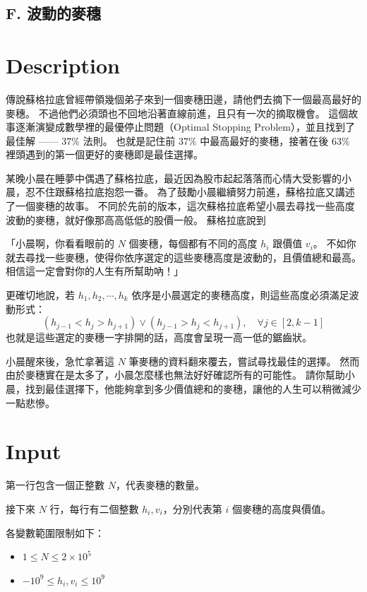 \documentclass[11pt,a4paper]{article}
\begin{document}
\begin{center}
\section*{F. 波動的麥穗}
\end{center}

\section*{Description}

傳說蘇格拉底曾經帶領幾個弟子來到一個麥穗田邊，請他們去摘下一個最高最好的麥穗。
不過他們必須頭也不回地沿著直線前進，且只有一次的摘取機會。
這個故事逐漸演變成數學裡的最優停止問題（Optimal Stopping Problem），並且找到了最佳解 —— $37\%$ 法則。
也就是記住前 $37\%$ 中最高最好的麥穗，接著在後 $63\%$ 裡頭遇到的第一個更好的麥穗即是最佳選擇。

某晚小晨在睡夢中偶遇了蘇格拉底，最近因為股市起起落落而心情大受影響的小晨，忍不住跟蘇格拉底抱怨一番。
為了鼓勵小晨繼續努力前進，蘇格拉底又講述了一個麥穗的故事。
不同於先前的版本，這次蘇格拉底希望小晨去尋找一些高度波動的麥穗，就好像那高高低低的股價一般。
蘇格拉底說到

\vspace{0.6cm}
「小晨啊，你看看眼前的 $N$ 個麥穗，每個都有不同的高度 $h_i$ 跟價值 $v_i$。
不如你就去尋找一些麥穗，使得你依序選定的這些麥穗高度是波動的，且價值總和最高。
相信這一定會對你的人生有所幫助吶！」
\vspace{0.6cm}

更確切地說，若 $h_1, h_2, \cdots, h_k$ 依序是小晨選定的麥穗高度，則這些高度必須滿足波動形式：
$$
	\left(h_{j-1} < h_j > h_{j+1}\right) \vee 
	\left(h_{j-1} > h_j < h_{j+1}\right)
	,\quad \forall j \in [2, k-1]
$$
也就是這些選定的麥穗一字排開的話，高度會呈現一高一低的鋸齒狀。

小晨醒來後，急忙拿著這 $N$ 筆麥穗的資料翻來覆去，嘗試尋找最佳的選擇。
然而由於麥穗實在是太多了，小晨怎麼樣也無法好好確認所有的可能性。
請你幫助小晨，找到最佳選擇下，他能夠拿到多少價值總和的麥穗，讓他的人生可以稍微減少一點悲慘。

\section*{Input}

第一行包含一個正整數 $N$，代表麥穗的數量。

接下來 $N$ 行，每行有二個整數 $h_i, v_i$，分別代表第 $i$ 個麥穗的高度與價值。

各變數範圍限制如下：
\begin{itemize}
    \item $1 \le N \le 2\times 10^5$
    \item $-10^9 \le h_i, v_i \le 10^9$
\end{itemize}
\end{document}
